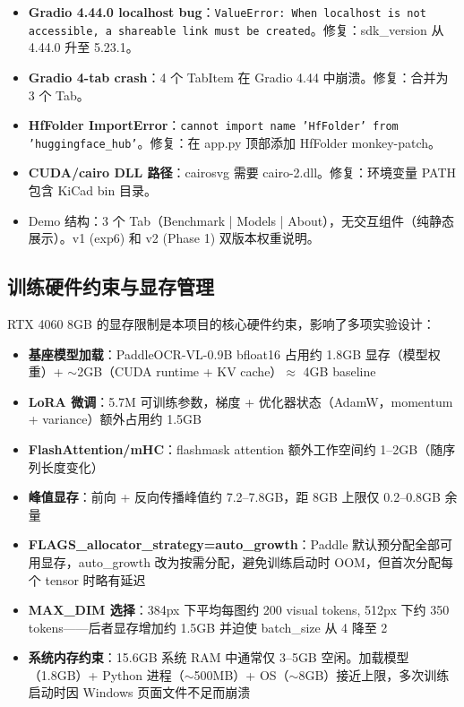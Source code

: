 \begin{itemize}[nosep]
    \item \textbf{Gradio 4.44.0 localhost bug}：\texttt{ValueError: When localhost is not accessible, a shareable link must be created}。修复：sdk\_version 从 4.44.0 升至 5.23.1。
    \item \textbf{Gradio 4-tab crash}：4 个 TabItem 在 Gradio 4.44 中崩溃。修复：合并为 3 个 Tab。
    \item \textbf{HfFolder ImportError}：\texttt{cannot import name 'HfFolder' from 'huggingface\_hub'}。修复：在 app.py 顶部添加 HfFolder monkey-patch。
    \item \textbf{CUDA/cairo DLL 路径}：cairosvg 需要 cairo-2.dll。修复：环境变量 PATH 包含 KiCad bin 目录。
    \item Demo 结构：3 个 Tab（Benchmark | Models | About），无交互组件（纯静态展示）。v1 (exp6) 和 v2 (Phase 1) 双版本权重说明。
\end{itemize}

\subsection{训练硬件约束与显存管理}

RTX 4060 8GB 的显存限制是本项目的核心硬件约束，影响了多项实验设计：

\begin{itemize}[nosep]
    \item \textbf{基座模型加载}：PaddleOCR-VL-0.9B bfloat16 占用约 1.8GB 显存（模型权重）+ $\sim$2GB（CUDA runtime + KV cache）$\approx$ 4GB baseline
    \item \textbf{LoRA 微调}：5.7M 可训练参数，梯度 + 优化器状态（AdamW，momentum + variance）额外占用约 1.5GB
    \item \textbf{FlashAttention/mHC}：flashmask attention 额外工作空间约 1--2GB（随序列长度变化）
    \item \textbf{峰值显存}：前向 + 反向传播峰值约 7.2--7.8GB，距 8GB 上限仅 0.2--0.8GB 余量
    \item \textbf{FLAGS\_allocator\_strategy=auto\_growth}：Paddle 默认预分配全部可用显存，auto\_growth 改为按需分配，避免训练启动时 OOM，但首次分配每个 tensor 时略有延迟
    \item \textbf{MAX\_DIM 选择}：384px 下平均每图约 200 visual tokens, 512px 下约 350 tokens——后者显存增加约 1.5GB 并迫使 batch\_size 从 4 降至 2
    \item \textbf{系统内存约束}：15.6GB 系统 RAM 中通常仅 3--5GB 空闲。加载模型（1.8GB）+ Python 进程（$\sim$500MB）+ OS（$\sim$8GB）接近上限，多次训练启动时因 Windows 页面文件不足而崩溃
\end{itemize}

